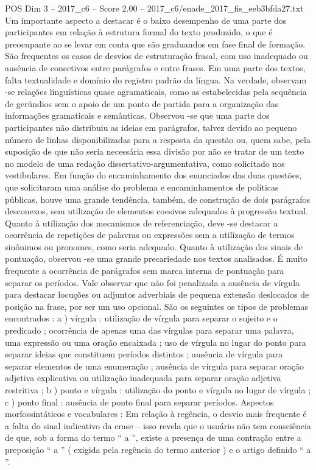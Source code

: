 \begin{textsample}{POS Dim 3 – 2017\_c6 – Score 2.00 – 2017\_c6/enade\_2017\_fis\_eeb3bfda27.txt}
Um importante aspecto a destacar é o baixo desempenho de uma parte dos participantes em relação à estrutura formal do texto produzido, o que é preocupante ao se levar em conta que são graduandos em fase final de formação.
São frequentes os casos de desvios de estruturação frasal, com uso inadequado ou ausência de conectivos entre parágrafos e entre frases.
Em uma parte dos textos, falta textualidade e domínio do registro padrão da língua.
Na verdade, observam -se relações linguísticas quase agramaticais, como as estabelecidas pela sequência de gerúndios sem o apoio de um ponto de partida para a organização das informações gramaticais e semânticas.
Observou -se que uma parte dos participantes não distribuiu as ideias em parágrafos, talvez devido ao pequeno número de linhas disponibilizadas para a resposta da questão ou, quem sabe, pela suposição de que não seria necessária essa divisão por não se tratar de um texto no modelo de uma redação dissertativo-argumentativa, como solicitado nos vestibulares.
Em função do encaminhamento dos enunciados das duas questões, que solicitaram uma análise do problema e encaminhamentos de políticas públicas, houve uma grande tendência, também, de construção de dois parágrafos desconexos, sem utilização de elementos coesivos adequados à progressão textual.
Quanto à utilização dos mecanismos de referenciação, deve -se destacar a ocorrência de repetições de palavras ou expressões sem a utilização de termos sinônimos ou pronomes, como seria adequado.
Quanto à utilização dos sinais de pontuação, observou -se uma grande precariedade nos textos analisados.
É muito frequente a ocorrência de parágrafos sem marca interna de pontuação para separar os períodos.
Vale observar que não foi penalizada a ausência de vírgula para destacar locuções ou adjuntos adverbiais de pequena extensão deslocados de posição na frase, por ser um uso opcional.
São os seguintes os tipos de problemas encontrados : a ) vírgula : utilização de vírgula para separar o sujeito e o predicado ; ocorrência de apenas uma das vírgulas para separar uma palavra, uma expressão ou uma oração encaixada ; uso de vírgula no lugar do ponto para separar ideias que constituem períodos distintos ; ausência de vírgula para separar elementos de uma enumeração ; ausência de vírgula para separar oração adjetiva explicativa ou utilização inadequada para separar oração adjetiva restritiva ; b ) ponto e vírgula : utilização do ponto e vírgula no lugar de vírgula ; c ) ponto final : ausência de ponto final para separar períodos.
Aspectos morfossintáticos e vocabulares : Em relação à regência, o desvio mais frequente é a falta do sinal indicativo da crase – isso revela que o usuário não tem consciência de que, sob a forma do termo “ a ”, existe a presença de uma contração entre a preposição “ a ” ( exigida pela regência do termo anterior ) e o artigo definido “ a ”.

\end{textsample}
